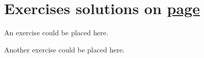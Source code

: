 \section*{Exercises \hfill \normalfont\textsf{\small solutions on \hyperlink{solutions_universal_construction}{page \pageref{solutions_universal_construction}}}}
\label{sec:universal_construction_exercises}
\vspace*{-0.4cm}\hrulefill\vspace*{-0.3cm}\footnotesize\begin{multicols}{2}\vspace*{-0.4cm}\raggedcolumns{}
\setlength{\parskip}{0pt}


\begin{problem}\label{exer:universal_construction_ex1}
	An exercise could be placed here.
\end{problem}


\mfilbreak


\begin{problem}\label{exer:universal_construction_ex2}
	Another exercise could be placed here.
\end{problem}


\end{multicols}
\normalsize\vspace*{0.01cm}
